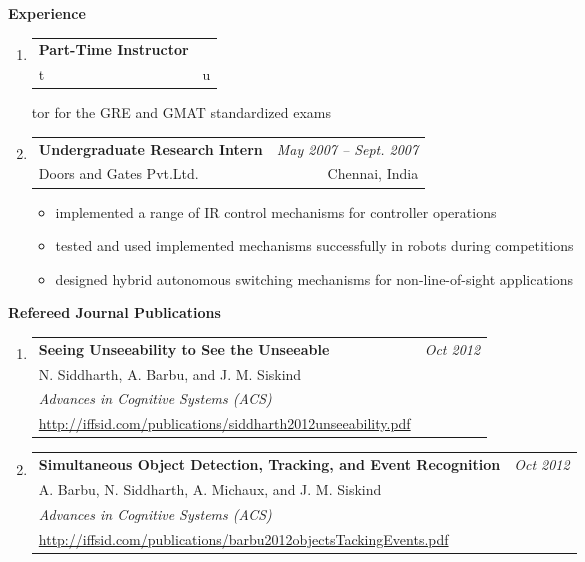 \documentclass[10pt]{article}
\makeatletter
\newenvironment{position}[4]
{%
\item
  \begin{tabular*}{6.5in}{l@{\extracolsep{\fill}}r}
    \textbf{#1} & \textit{#2} \\ #3 & \small{#4} \\
  \end{tabular*}
  \begin{itemize} \setlength{\parskip}{-1pt}}
  { \end{itemize} }
\newenvironment{publication}[5]
{ \item
  \begin{tabular*}{6.5in}{p{5.3in}@{\extracolsep{\fill}}r}
    \textbf{#1} & \textit{#2}\\ #3 &\\ \textit{#4}\\ #5
  \end{tabular*}
} {}
\newenvironment{region}[2]{%
  \vspace*{0.5ex}
  {\large \textbf{#1}}
  \begin{enumerate}[\color{RoyalBlue}#2]}
  {\end{enumerate}}
\makeatother
\begin{document}
\begin{region} {Experience}{}
\begin{position} {Part-Time Instructor}
  \item tutor for the GRE and GMAT standardized exams
  \end{position}
  \begin{position} {Undergraduate Research Intern}
    {May 2007 -- Sept. 2007}
    {Doors and Gates Pvt.Ltd.}
    {Chennai, India}
    \vspace{-0.05in}
  \item implemented a range of IR control mechanisms for controller operations
  \item tested and used implemented mechanisms successfully in robots during competitions
  \item designed hybrid autonomous switching mechanisms for non-line-of-sight applications
  \end{position}
\end{region}


\begin{region} {Refereed Journal Publications}{{J}1}
  \begin{publication} {Seeing Unseeability to See the Unseeable}
    {Oct 2012}
    {N. Siddharth, A. Barbu, and J. M. Siskind}
    {Advances in Cognitive Systems (ACS)}
    {\url{http://iffsid.com/publications/siddharth2012unseeability.pdf}}
  \end{publication}
  \begin{publication} {Simultaneous Object Detection, Tracking, and Event Recognition}
    {Oct 2012}
    {A. Barbu, N. Siddharth, A. Michaux, and J. M. Siskind}
    {Advances in Cognitive Systems (ACS)}
    {\url{http://iffsid.com/publications/barbu2012objectsTackingEvents.pdf}}
  \end{publication}
\end{region}
\end{document}
